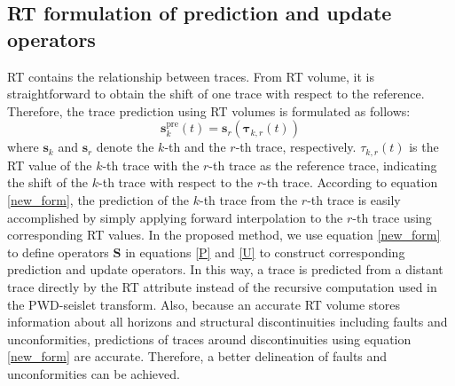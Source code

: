 
\subsection{RT formulation of prediction and update operators}
    RT contains the relationship between traces. 
    From RT volume, it is straightforward to obtain the shift of one trace with 
    respect to the reference. 
    Therefore, the trace prediction using RT volumes is formulated as follows:
    \begin{equation}
        \mathbf{s}_k^{\text{pre}}(t)=\mathbf{s}_r(\mathbf{\tau}_{k,r}(t))
        \label{new_form}
    \end{equation}
    where $\mathbf{s}_k$ and $\mathbf{s}_r$ denote the $k$-th and the $r$-th 
    trace, respectively. 
    $\tau_{k,r}(t)$ is the RT value of the $k$-th trace with the $r$-th trace as 
    the reference trace, indicating the shift of the $k$-th trace with
    respect to the $r$-th trace. 
    According to equation \ref{new_form}, the prediction of the $k$-th trace 
    from the $r$-th trace is easily accomplished by simply applying forward 
    interpolation to the $r$-th trace using corresponding RT values.
    In the proposed method, we use equation \ref{new_form} to define operators 
    $\mathbf{S}$ in equations \ref{P} and \ref{U} to construct corresponding 
    prediction and update operators. 
    In this way, a trace is predicted from a distant trace directly by the 
    RT attribute instead of the recursive computation used in the PWD-seislet 
    transform. 
    Also, because an accurate RT volume stores information about all horizons 
    and structural discontinuities including faults and unconformities, 
    predictions of traces around discontinuities using equation 
    \ref{new_form} are accurate. 
    Therefore, a better delineation of faults and unconformities can be 
    achieved.

